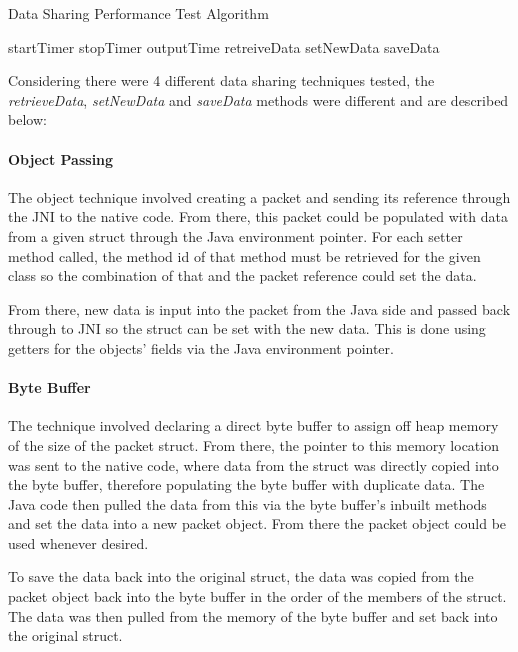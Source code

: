 \documentclass[final_report.tex]{subfiles}
\begin{document}
\begin{algorithm}[H]
	\caption{Data Sharing Performance Test Algorithm}
	\label{alg:data}
	\begin{algorithmic}[1]
				\State startTimer
				\State {}
				\State stopTimer
				\State outputTime				
			\EndFor
		\EndFunction
		\newline
				\State retreiveData
				\State setNewData
				\State saveData
			\EndFor
		\EndFunction
	\end{algorithmic}
\end{algorithm}

Considering there were 4 different data sharing techniques tested, the \textit{retrieveData}, \textit{setNewData} and \textit{saveData} methods were different and are described below:

\paragraph*{Object Passing}
The object technique involved creating a packet and sending its reference through the JNI to the native code. From there, this packet could be populated with data from a given struct through the Java environment pointer. For each setter method called, the method id of that method must be retrieved for the given class so the combination of that and the packet reference could set the data.

From there, new data is input into the packet from the Java side and passed back through to JNI so the struct can be set with the new data. This is done using getters for the objects' fields via the Java environment pointer.

\paragraph*{Byte Buffer}
The technique involved declaring a direct byte buffer to assign off heap memory of the size of the packet struct. From there, the pointer to this memory location was sent to the native code, where data from the struct was directly copied into the byte buffer, therefore populating the byte buffer with duplicate data. The Java code then pulled the data from this via the byte buffer's inbuilt methods and set the data into a new packet object. From there the packet object could be used whenever desired.

To save the data back into the original struct, the data was copied from the packet object back into the byte buffer in the order of the members of the struct. The data was then pulled from the memory of the byte buffer and set back into the original struct.
\end{document}
